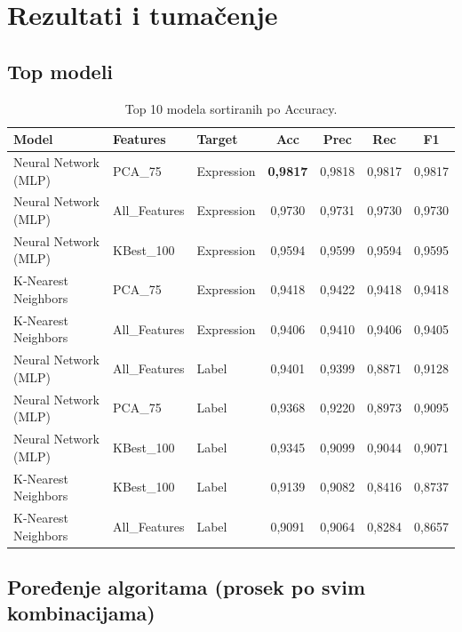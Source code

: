 \documentclass[12pt,a4paper]{article}
\begin{document}
\section{Rezultati i tumačenje}

\subsection{Top modeli}

\begin{table}[H]
\centering
\small
\begin{tabular}{lllcccc}
\toprule
\textbf{Model} & \textbf{Features} & \textbf{Target} & \textbf{Acc} & \textbf{Prec} & \textbf{Rec} & \textbf{F1} \\
\midrule
Neural Network (MLP) & PCA\_75        & Expression & \textbf{0,9817} & 0,9818 & 0,9817 & 0,9817 \\
Neural Network (MLP) & All\_Features  & Expression & 0,9730 & 0,9731 & 0,9730 & 0,9730 \\
Neural Network (MLP) & KBest\_100     & Expression & 0,9594 & 0,9599 & 0,9594 & 0,9595 \\
K-Nearest Neighbors  & PCA\_75        & Expression & 0,9418 & 0,9422 & 0,9418 & 0,9418 \\
K-Nearest Neighbors  & All\_Features  & Expression & 0,9406 & 0,9410 & 0,9406 & 0,9405 \\
Neural Network (MLP) & All\_Features  & Label      & 0,9401 & 0,9399 & 0,8871 & 0,9128 \\
Neural Network (MLP) & PCA\_75        & Label      & 0,9368 & 0,9220 & 0,8973 & 0,9095 \\
Neural Network (MLP) & KBest\_100     & Label      & 0,9345 & 0,9099 & 0,9044 & 0,9071 \\
K-Nearest Neighbors  & KBest\_100     & Label      & 0,9139 & 0,9082 & 0,8416 & 0,8737 \\
K-Nearest Neighbors  & All\_Features  & Label      & 0,9091 & 0,9064 & 0,8284 & 0,8657 \\
\bottomrule
\end{tabular}
\caption{Top 10 modela sortiranih po Accuracy.}
\label{tab:top}
\end{table}

\subsection{Poređenje algoritama (prosek po svim kombinacijama)}
\end{document}
